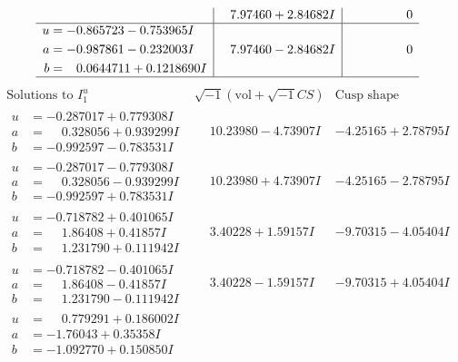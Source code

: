 \documentclass[1p]{elsarticle_modified}
\theoremstyle{definition}
\newcommand{\I}{\sqrt{-1}}
\begin{document}
$$\begin{array}{c|c|c}
 & \phantom{-}7.97460 + 2.84682 I & \phantom{-0.000000 } 0 \\ \hline\begin{aligned}
u &= -0.865723 - 0.753965 I \\
a &= -0.987861 - 0.232003 I \\
b &= \phantom{-}0.0644711 + 0.1218690 I\end{aligned}
 & \phantom{-}7.97460 - 2.84682 I & \phantom{-0.000000 } 0\\
 \hline 
 \end{array}$$\newpage$$\begin{array}{c|c|c}  
\text{Solutions to }I^u_{1}& \I (\text{vol} + \sqrt{-1}CS) & \text{Cusp shape}\\
 \hline 
\begin{aligned}
u &= -0.287017 + 0.779308 I \\
a &= \phantom{-}0.328056 + 0.939299 I \\
b &= -0.992597 - 0.783531 I\end{aligned}
 & \phantom{-}10.23980 - 4.73907 I & -4.25165 + 2.78795 I \\ \hline\begin{aligned}
u &= -0.287017 - 0.779308 I \\
a &= \phantom{-}0.328056 - 0.939299 I \\
b &= -0.992597 + 0.783531 I\end{aligned}
 & \phantom{-}10.23980 + 4.73907 I & -4.25165 - 2.78795 I \\ \hline\begin{aligned}
u &= -0.718782 + 0.401065 I \\
a &= \phantom{-}1.86408 + 0.41857 I \\
b &= \phantom{-}1.231790 + 0.111942 I\end{aligned}
 & \phantom{-}3.40228 + 1.59157 I & -9.70315 - 4.05404 I \\ \hline\begin{aligned}
u &= -0.718782 - 0.401065 I \\
a &= \phantom{-}1.86408 - 0.41857 I \\
b &= \phantom{-}1.231790 - 0.111942 I\end{aligned}
 & \phantom{-}3.40228 - 1.59157 I & -9.70315 + 4.05404 I \\ \hline\begin{aligned}
u &= \phantom{-}0.779291 + 0.186002 I \\
a &= -1.76043 + 0.35358 I \\
b &= -1.092770 + 0.150850 I\end{aligned}

\end{array}$$
\end{document}
